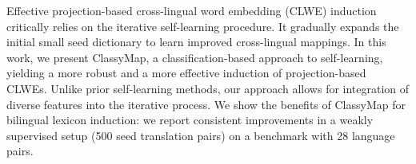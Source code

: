 Effective projection-based cross-lingual word embedding (CLWE) induction critically relies on the iterative self-learning procedure. It gradually expands the initial small seed dictionary to learn improved cross-lingual mappings. In this work, we present ClassyMap, a classification-based approach to self-learning, yielding a more robust and a more effective induction of projection-based CLWEs. Unlike prior self-learning methods, our approach allows for integration of diverse features into the iterative process. We show the benefits of ClassyMap for bilingual lexicon induction: we report consistent improvements in a weakly supervised setup (500 seed translation pairs) on a benchmark with 28 language pairs.
